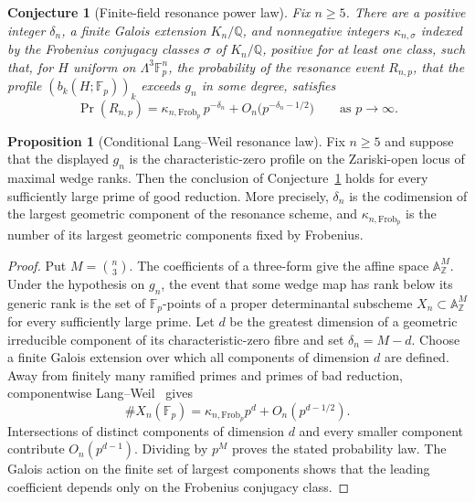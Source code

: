 \documentclass[11pt]{article}
\newtheorem{conjecture}{Conjecture}
\theoremstyle{definition}
\newcommand{\Q}{\mathbb Q}
\providecommand{\Q}{\mathbb Q}
\newtheorem{proposition}{Proposition}
\begin{document}
\begin{conjecture}[Finite-field resonance power law]\label{aa5}
Fix $n\ge5$.  There are a positive integer $\delta_n$, a finite Galois extension $K_n/\Q$, and nonnegative integers $\kappa_{n,\sigma}$ indexed by the Frobenius conjugacy classes $\sigma$ of $K_n/\Q$, positive for at least one class, such that, for $H$ uniform on $\Lambda^3\mathbb F_p^n$, the probability of the resonance event $R_{n,p}$, that the profile $(b_k(H;\mathbb F_p))_k$ exceeds $g_n$ in some degree, satisfies
\[
\Pr(R_{n,p})=\kappa_{n,\mathrm{Frob}_p}\,p^{-\delta_n}+O_n\bigl(p^{-\delta_n-1/2}\bigr)
\qquad\text{as }p\to\infty.
\]
\end{conjecture}

\begin{proposition}[Conditional Lang--Weil resonance law]\label{aa:langweil}
Fix $n\ge5$ and suppose that the displayed $g_n$ is the characteristic-zero profile on the Zariski-open locus of maximal wedge ranks.  Then the conclusion of Conjecture~\ref{aa5} holds for every sufficiently large prime of good reduction.  More precisely, $\delta_n$ is the codimension of the largest geometric component of the resonance scheme, and $\kappa_{n,\mathrm{Frob}_p}$ is the number of its largest geometric components fixed by Frobenius.
\end{proposition}

\begin{proof}
Put $M=\binom n3$.  The coefficients of a three-form give the affine space $\mathbb A^M_{\mathbb Z}$.  Under the hypothesis on $g_n$, the event that some wedge map has rank below its generic rank is the set of $\mathbb F_p$-points of a proper determinantal subscheme $X_n\subset\mathbb A^M_{\mathbb Z}$ for every sufficiently large prime.  Let $d$ be the greatest dimension of a geometric irreducible component of its characteristic-zero fibre and set $\delta_n=M-d$.  Choose a finite Galois extension over which all components of dimension $d$ are defined.  Away from finitely many ramified primes and primes of bad reduction, componentwise Lang--Weil~\cite{LW54} gives
\[
\#X_n(\mathbb F_p)=\kappa_{n,\mathrm{Frob}_p}p^d+O_n(p^{d-1/2}).
\]
Intersections of distinct components of dimension $d$ and every smaller component contribute $O_n(p^{d-1})$.  Dividing by $p^M$ proves the stated probability law.  The Galois action on the finite set of largest components shows that the leading coefficient depends only on the Frobenius conjugacy class.
\end{proof}
\end{document}
